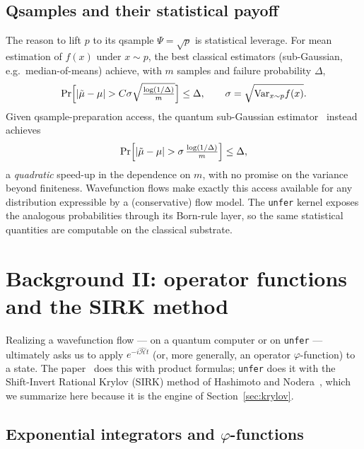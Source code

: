 \documentclass[11pt, a4paper]{article}
\newcommand{\Hgen}{\hat{\mathcal{H}}}
\begin{document}
\subsection{Qsamples and their statistical payoff}
\label{sec:qsample}

The reason to lift $p$ to its qsample $\Psi=\sqrt p$ is statistical leverage.
For mean estimation of $f(x)$ under $x\sim p$, the best classical estimators
(sub-Gaussian, e.g.\ median-of-means) achieve, with $m$ samples and failure
probability $\Delta$,
\begin{equation}
  \Pr\Bigl[|\tilde\mu-\mu|>C\sigma\sqrt{\tfrac{\log(1/\Delta)}{m}}\Bigr]\le\Delta,
  \qquad \sigma=\sqrt{\mathrm{Var}_{x\sim p}f(x)} .
\end{equation}
Given qsample-preparation access, the quantum sub-Gaussian
estimator~\cite{Layden2025} instead achieves
\begin{equation}
  \Pr\Bigl[|\tilde\mu-\mu|>\sigma\,\tfrac{\log(1/\Delta)}{m}\Bigr]\le\Delta,
\end{equation}
a \emph{quadratic} speed-up in the dependence on $m$, with no promise on the
variance beyond finiteness. Wavefunction flows make exactly this access
available for any distribution expressible by a (conservative) flow model. The
\texttt{unfer} kernel exposes the analogous probabilities through its Born-rule
layer, so the same statistical quantities are computable on the classical
substrate.

\section{Background II: operator functions and the SIRK method}
\label{sec:sirk}

Realizing a wavefunction flow --- on a quantum computer or on \texttt{unfer} ---
ultimately asks us to apply $e^{-i\Hgen t}$ (or, more generally, an operator
$\varphi$-function) to a state. The paper~\cite{Layden2025} does this with
product formulas; \texttt{unfer} does it with the Shift-Invert Rational Krylov
(SIRK) method of Hashimoto and Nodera~\cite{Hashimoto2019}, which we summarize
here because it is the engine of Section~\ref{sec:krylov}.

\subsection{Exponential integrators and \texorpdfstring{$\varphi$}{phi}-functions}
\end{document}
